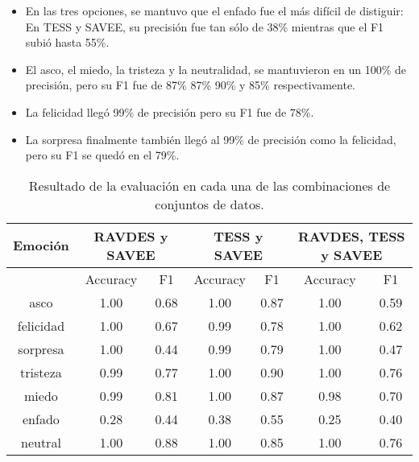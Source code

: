\documentclass[11pt,a4paper,spanish]{book}
\begin{document}
	\begin{itemize}
		\item En las tres opciones, se mantuvo que el enfado fue el más difícil de distiguir: En TESS y SAVEE, su precisión fue tan sólo de 38\% mientras que el F1 subió hasta 55\%.
		
		\item El asco, el miedo, la tristeza y la neutralidad, se mantuvieron en un 100\% de precisión, pero su F1 fue de 87\% 87\% 90\% y 85\% respectivamente.
		
		\item La felicidad llegó 99\% de precisión pero su F1 fue de 78\%.
		
		\item La sorpresa finalmente también llegó al 99\% de precisión como la felicidad, pero su F1 se quedó en el 79\%.
	\end{itemize}

	
	\begin{table}[H]
		\centering
		\begin{center}
			\begin{tabular}{| c|| c c |  c c |  c c | }
				\hline
					\multicolumn{1}{|c||}{Emoción} & 
					\multicolumn{2}{|c|}{RAVDES y SAVEE}&
					\multicolumn{2}{|c|}{TESS y SAVEE} &
					\multicolumn{2}{|c|}{RAVDES, TESS y SAVEE} \\
				\hline
				 	& 
					 \multicolumn{1}{|c|}{Accuracy}&\multicolumn{1}{|c|}{F1}&
					 \multicolumn{1}{|c|}{Accuracy}&\multicolumn{1}{|c|}{F1}&
					 \multicolumn{1}{|c|}{Accuracy}&\multicolumn{1}{|c|}{F1}\\
				\hline

				asco 		& 1.00 & 0.68 & 1.00 & 0.87 & 1.00 & 0.59\\
				felicidad 	& 1.00 & 0.67 & 0.99 & 0.78 & 1.00 & 0.62\\
				sorpresa 	& 1.00 & 0.44 & 0.99 & 0.79 & 1.00 & 0.47\\
				tristeza 	& 0.99 & 0.77 & 1.00 & 0.90 & 1.00 & 0.76\\
				miedo 		& 0.99 & 0.81 & 1.00 & 0.87 & 0.98 & 0.70\\
				enfado 		& 0.28 & 0.44 & 0.38 & 0.55 & 0.25 & 0.40\\
				neutral 	& 1.00 & 0.88 & 1.00 & 0.85 & 1.00 & 0.76\\
				\hline
			\end{tabular}
			
			\caption{Resultado de la evaluación en cada una de las combinaciones de conjuntos de datos.}
			\label{result_Test3}
		\end{center}
	\end{table}
	
\end{document}
